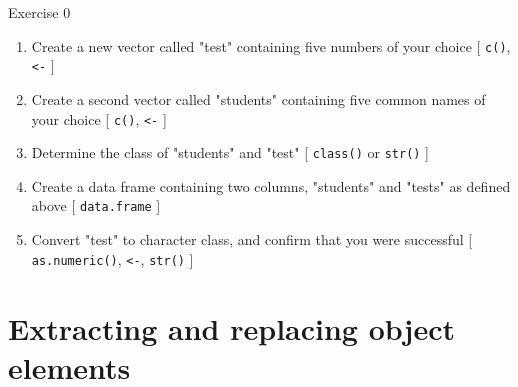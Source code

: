 \documentclass[table,smaller]{beamer}
\begin{document}
\begin{frame}[fragile,label=sec-2-6]{Exercise 0}
 \begin{enumerate}
\item Create a new vector called "test" containing five numbers of your choice [ \verb~c()~, \verb~<-~ ]
\item Create a second vector called "students" containing five common names of your choice [ \verb~c()~, \verb~<-~ ]
\item Determine the class of "students" and "test" [ \verb~class()~ or \verb~str()~ ]
\item Create a data frame containing two columns, "students" and "tests" as defined above [ \verb~data.frame~ ]
\item Convert "test" to character class, and confirm that you were successful [ \verb~as.numeric()~, \verb~<-~, \verb~str()~ ]
\end{enumerate}
\end{frame}

\section{Extracting and replacing object elements}
\label{sec-3}
\end{document}
